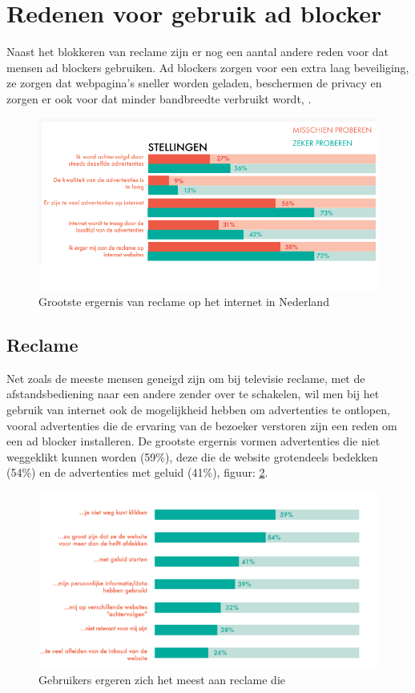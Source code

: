 \documentclass[pdftex,a4paper,12pt,twoside]{report}
\begin{document}
\section{Redenen voor gebruik ad blocker}
\label{sec:Redenen voor gebruik ad blocker}
Naast het blokkeren van reclame zijn er nog een aantal andere reden voor dat mensen ad blockers gebruiken. Ad blockers zorgen voor een extra laag beveiliging, ze zorgen dat webpagina's sneller worden geladen, beschermen de privacy en zorgen er ook voor dat minder bandbreedte verbruikt wordt, \cite{IAB2014}.

\begin{figure}[h!]
\centering
\includegraphics[width=12cm]{img/redenadblockgebruik}
\caption{Grootste ergernis van reclame op het internet in Nederland}
\label{fig: redenadblockgebruik}
\end{figure}

\subsection{Reclame}
\label{sec Reclame}
Net zoals de meeste mensen geneigd zijn om bij televisie reclame, met de afstandsbediening naar een andere zender over te schakelen, wil men bij het gebruik van internet ook de mogelijkheid hebben om advertenties te ontlopen, vooral advertenties die de ervaring van de bezoeker verstoren zijn een reden om een ad blocker installeren. De grootste ergernis vormen advertenties die niet weggeklikt kunnen worden (59\%), deze die de website grotendeels bedekken (54\%) en de advertenties met geluid (41\%), figuur: \ref{fig: Redenadblockreclame}.
\begin{figure}[h!]
\centering
\includegraphics[width=12cm]{img/Redenadblockreclame}
\caption{Gebruikers ergeren zich het meest aan reclame die}
\label{fig: Redenadblockreclame}
\end{figure}
\end{document}
